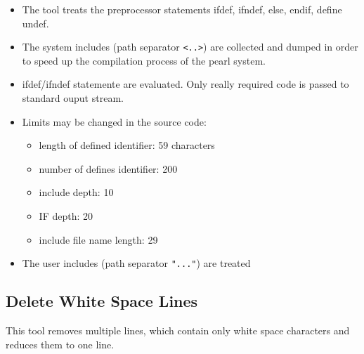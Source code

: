 \begin{itemize}
\item The tool treats the preprocessor statements 
ifdef, ifndef, else, endif, define undef.
\item The system includes (path separator \verb|<..>|) are collected
and dumped in order to speed up the compilation process of the 
pearl system.
\item ifdef/ifndef statemente are evaluated. Only really required code
   is passed to standard ouput stream.
\item Limits may be changed in the source code: 
   \begin{itemize}
   \item length of defined identifier: 59 characters
   \item number of defines identifier: 200
   \item include depth: 10
   \item IF depth: 20
   \item include file name length: 29
   \end{itemize}
\item The user includes (path separator \verb|"..."|) are treated
\end{itemize}
 

\subsection{Delete White Space Lines}
This tool removes multiple lines, which contain only white space characters
and reduces them to one line.

%
%


